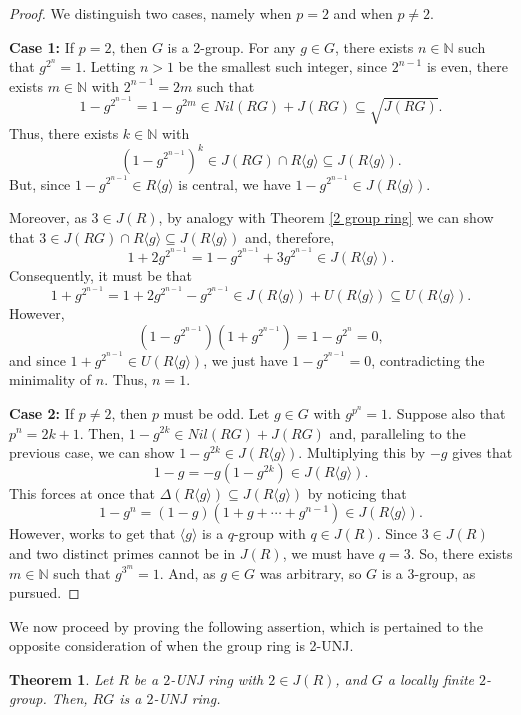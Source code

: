 \documentclass[12pt]{amsart}
\newtheorem{theorem}{Theorem}[section]
\theoremstyle{definition}
\begin{document}
\begin{proof}
We distinguish two cases, namely when $p=2$ and when $p \neq 2$.

\medskip

\textbf{Case 1:} If $p=2$, then $G$ is a 2-group. For any $g \in G$, there exists $n \in \mathbb{N}$ such that $g^{2^n}=1$. Letting $n>1$ be the smallest such integer, since $2^{n-1}$ is even, there exists $m \in \mathbb{N}$ with $2^{n-1}=2m$ such that
\[
1-g^{2^{n-1}}=1-g^{2m} \in Nil(RG)+J(RG) \subseteq \sqrt{J(RG)}.
\]
Thus, there exists $k \in \mathbb{N}$ with $$(1-g^{2^{n-1}})^k \in J(RG) \cap R\langle g\rangle \subseteq J(R\langle g\rangle).$$ But, since $1-g^{2^{n-1}} \in R\langle g\rangle$ is central, we have $1-g^{2^{n-1}} \in J(R\langle g\rangle)$.

Moreover, as $3 \in J(R)$, by analogy with Theorem \ref{2 group ring} we can show that $3 \in J(RG) \cap R\langle g\rangle \subseteq J(R\langle g\rangle)$ and, therefore,
\[
1+2g^{2^{n-1}}=1-g^{2^{n-1}}+3g^{2^{n-1}} \in J(R\langle g\rangle).
\]
Consequently, it must be that 
\[
1+g^{2^{n-1}}=1+2g^{2^{n-1}}-g^{2^{n-1}} \in J(R\langle g\rangle) +U(R\langle g\rangle) \subseteq U(R\langle g\rangle).
\]
However, $$(1-g^{2^{n-1}})(1+g^{2^{n-1}})=1-g^{2^{n}}=0,$$ and since $1+g^{2^{n-1}}\in U(R\langle g\rangle)$, we just have $1-g^{2^{n-1}}=0$, contradicting the minimality of $n$. Thus, $n=1$.

\medskip

\textbf{Case 2:} If $p \neq 2$, then $p$ must be odd. Let $g \in G$ with $g^{p^n}=1$. Suppose also that $p^n=2k+1$. Then, $1-g^{2k} \in Nil(RG)+J(RG)$ and, paralleling to the previous case, we can show $1-g^{2k}\in J(R\langle g\rangle)$. Multiplying this by $-g$ gives that
\[
1-g=-g(1-g^{2k})\in J(R\langle g\rangle).
\]
This forces at once that $\Delta(R\langle g\rangle) \subseteq J(R\langle g\rangle)$ by noticing that $$1-g^n=(1-g)(1+g + \cdots + g^{n-1}) \in J(R\langle g\rangle).$$ However, \cite[Proposition 15(i)]{coon} works to get that $\langle g\rangle$ is a $q$-group with $q \in J(R)$. Since $3\in J(R)$ and two distinct primes cannot be in $J(R)$, we must have $q=3$. So, there exists $m \in \mathbb{N}$ such that $g^{3^m}=1$. And, as $g \in G$ was arbitrary, so $G$ is a 3-group, as pursued.
\end{proof}

We now proceed by proving the following assertion, which is pertained to the opposite consideration of when the group ring is 2-UNJ.

\begin{theorem}\label{T2}
Let $R$ be a $2$-UNJ ring with $2 \in J(R)$, and $G$ a locally finite $2$-group. Then, $RG$ is a $2$-UNJ ring.
\end{theorem}
\end{document}
